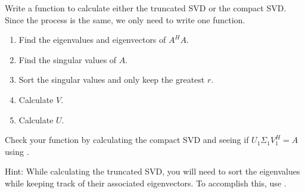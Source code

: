 \begin{problem}
Write a function to calculate either the truncated SVD or the compact SVD.
Since the process is the same, we only need to write one function.

\begin{enumerate}
\item Find the eigenvalues and eigenvectors of $A^H A$.
\item Find the singular values of $A$.
\item Sort the singular values and only keep the greatest $r$.
\item Calculate $V$.
\item Calculate $U$.
\end{enumerate}

Check your function by calculating the compact SVD and seeing if $U_1\Sigma_1 V_1^H = A$ using .

Hint: While calculating the truncated SVD, you will need to sort the eigenvalues while keeping track of their associated eigenvectors. To accomplish this, use .

\label{prob:calc_svd}
\end{problem}

